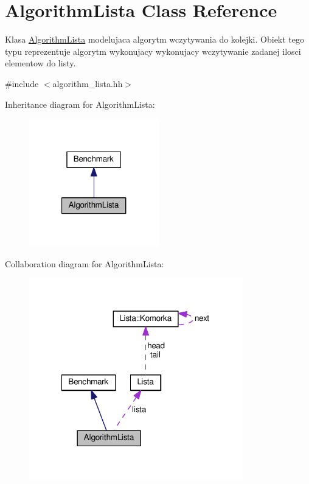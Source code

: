 \hypertarget{class_algorithm_lista}{\section{Algorithm\-Lista Class Reference}
\label{class_algorithm_lista}
}


Klasa \hyperlink{class_algorithm_lista}{Algorithm\-Lista} modelujaca algorytm wczytywania do kolejki. Obiekt tego typu reprezentuje algorytm wykonujacy wykonujacy wczytywanie zadanej ilosci elementow do listy.  




{\ttfamily \#include $<$algorithm\-\_\-lista.\-hh$>$}



Inheritance diagram for Algorithm\-Lista\-:\nopagebreak
\begin{figure}[H]
\begin{center}
\leavevmode
\includegraphics[width=160pt]{class_algorithm_lista__inherit__graph}
\end{center}
\end{figure}


Collaboration diagram for Algorithm\-Lista\-:\nopagebreak
\begin{figure}[H]
\begin{center}
\leavevmode
\includegraphics[width=263pt]{class_algorithm_lista__coll__graph}
\end{center}
\end{figure}
